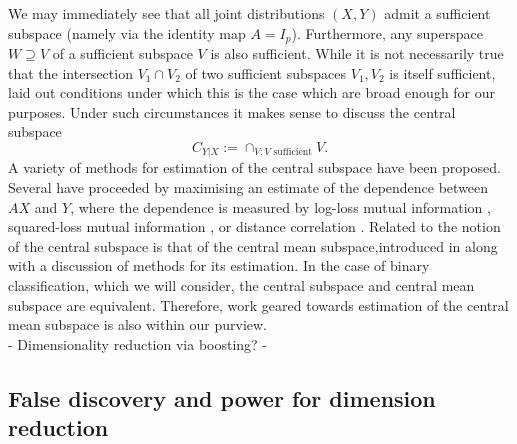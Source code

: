\documentclass[12pt]{article}
\begin{document}
We may immediately see that all joint distributions $(X,Y)$ admit a sufficient subspace (namely via the identity map $A= I_p$). Furthermore, any superspace $W \supseteq V$ of a sufficient subspace $V$ is also sufficient. While it is not necessarily true that the intersection $V_1 \cap V_2$ of two sufficient subspaces $V_1,V_2$ is itself sufficient, \citet[Lemma 2]{cook_graphics_1996} laid out conditions under which this is the case which are broad enough for our purposes. Under such circumstances it makes sense to discuss the central subspace 
\begin{equation*}
    C_{Y|X} := \cap_{V: V\text{ sufficient}}V.
\end{equation*}
A variety of methods for estimation of the central subspace have been proposed. Several have proceeded by maximising an estimate of the dependence between $AX$ and $Y$, where the dependence is measured by log-loss mutual information \citep{torkkola_feature_2003, suzuki_approximating_2008}, squared-loss mutual information \citep{suzuki_sufficient_2012, yamada_sufficient_2011}, or distance correlation \citep{vepakomma_supervised_2018}. Related to the notion of the central subspace is that of the central mean subspace,introduced in \citet{cook_dimension_2002} along with a discussion of methods for its estimation. In the case of binary classification, which we will consider, the central subspace and central mean subspace are equivalent. Therefore, work geared towards estimation of the central mean subspace \citep[see for example][]{ma_estimation_2014} is also within our purview.\\

- Dimensionality reduction via boosting? -\\

\subsection{False discovery and power for dimension reduction}
\citep{taeb_false_2020}
\end{document}
